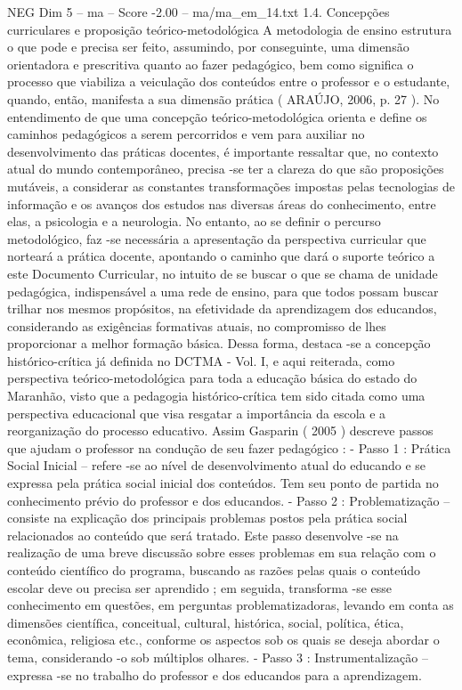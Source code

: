 \begin{textsample}{NEG Dim 5 – ma – Score -2.00 – ma/ma\_em\_14.txt}  \label{ex:f5_neg_111}
1.4.
Concepções curriculares e proposição teórico-metodológica A metodologia de ensino estrutura o que pode e precisa ser feito, assumindo, por conseguinte, uma dimensão orientadora e prescritiva quanto ao fazer pedagógico, bem como significa o processo que viabiliza a veiculação dos conteúdos entre o professor e o estudante, quando, então, manifesta a sua dimensão prática ( ARAÚJO, 2006, p. 27 ).
No entendimento de que uma concepção teórico-metodológica orienta e define os caminhos pedagógicos a serem percorridos e vem para auxiliar no desenvolvimento das práticas docentes, é importante ressaltar que, no contexto atual do mundo contemporâneo, precisa -se ter a clareza do que são proposições mutáveis, a considerar as constantes transformações impostas pelas tecnologias de informação e os avanços dos estudos nas diversas áreas do conhecimento, entre elas, a psicologia e a neurologia.
No entanto, ao se definir o percurso metodológico, faz -se necessária a apresentação da perspectiva curricular que norteará a prática docente, apontando o caminho que dará o suporte teórico a este Documento Curricular, no intuito de se buscar o que se chama de unidade pedagógica, indispensável a uma rede de ensino, para que todos possam buscar trilhar nos mesmos propósitos, na efetividade da aprendizagem dos educandos, considerando as exigências formativas atuais, no compromisso de lhes proporcionar a melhor formação básica.
Dessa forma, destaca -se a concepção histórico-crítica já definida no DCTMA - Vol.
I, e aqui reiterada, como perspectiva teórico-metodológica para toda a educação básica do estado do Maranhão, visto que a pedagogia histórico-crítica tem sido citada como uma perspectiva educacional que visa resgatar a importância da escola e a reorganização do processo educativo.
Assim Gasparin ( 2005 ) descreve passos que ajudam o professor na condução de seu fazer pedagógico : - Passo 1 : Prática Social Inicial – refere -se ao nível de desenvolvimento atual do educando e se expressa pela prática social inicial dos conteúdos.
Tem seu ponto de partida no conhecimento prévio do professor e dos educandos. - Passo 2 : Problematização – consiste na explicação dos principais problemas postos pela prática social relacionados ao conteúdo que será tratado.
Este passo desenvolve -se na realização de uma breve discussão sobre esses problemas em sua relação com o conteúdo científico do programa, buscando as razões pelas quais o conteúdo escolar deve ou precisa ser aprendido ; em seguida, transforma -se esse conhecimento em questões, em perguntas problematizadoras, levando em conta as dimensões científica, conceitual, cultural, histórica, social, política, ética, econômica, religiosa etc., conforme os aspectos sob os quais se deseja abordar o tema, considerando -o sob múltiplos olhares. - Passo 3 : Instrumentalização – expressa -se no trabalho do professor e dos educandos para a aprendizagem.

\end{textsample}
